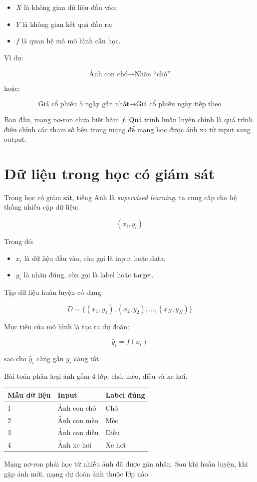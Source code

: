 \documentclass[12pt,a4paper]{report}
\begin{document}
\begin{itemize}
    \item $X$ là không gian dữ liệu đầu vào;
    \item $Y$ là không gian kết quả đầu ra;
    \item $f$ là quan hệ mà mô hình cần học.
\end{itemize}

Ví dụ:

\[
    \text{Ảnh con chó} \rightarrow \text{Nhãn ``chó''}
\]

hoặc:

\[
    \text{Giá cổ phiếu 5 ngày gần nhất} \rightarrow \text{Giá cổ phiếu ngày tiếp theo}
\]

\begin{ghinho}
Ban đầu, mạng nơ-ron chưa biết hàm $f$. Quá trình huấn luyện chính là quá trình điều chỉnh các tham số bên trong mạng để mạng học được ánh xạ từ input sang output.
\end{ghinho}

\section{Dữ liệu trong học có giám sát}

Trong học có giám sát, tiếng Anh là \textit{supervised learning}, ta cung cấp cho hệ thống nhiều cặp dữ liệu:

\[
    (x_i, y_i)
\]

Trong đó:

\begin{itemize}
    \item $x_i$ là dữ liệu đầu vào, còn gọi là input hoặc data;
    \item $y_i$ là nhãn đúng, còn gọi là label hoặc target.
\end{itemize}

Tập dữ liệu huấn luyện có dạng:

\[
    D = \{(x_1,y_1),(x_2,y_2),\ldots,(x_N,y_N)\}
\]

Mục tiêu của mô hình là tạo ra dự đoán:

\[
    \hat{y}_i = f(x_i)
\]

sao cho $\hat{y}_i$ càng gần $y_i$ càng tốt.

\begin{vidu}
Bài toán phân loại ảnh gồm 4 lớp: chó, mèo, diều và xe hơi.

\begin{center}
\begin{tabular}{lll}
\toprule
Mẫu dữ liệu & Input & Label đúng \\
\midrule
1 & Ảnh con chó & Chó \\
2 & Ảnh con mèo & Mèo \\
3 & Ảnh con diều & Diều \\
4 & Ảnh xe hơi & Xe hơi \\
\bottomrule
\end{tabular}
\end{center}

Mạng nơ-ron phải học từ nhiều ảnh đã được gán nhãn. Sau khi huấn luyện, khi gặp ảnh mới, mạng dự đoán ảnh thuộc lớp nào.
\end{vidu}
\end{document}
